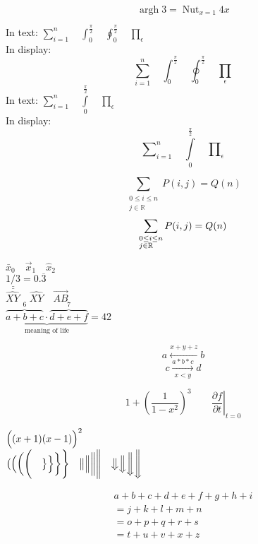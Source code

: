 \documentclass{article}
\DeclareMathOperator{\argh}{argh}
\DeclareMathOperator*{\nut}{Nut}
\begin{document}
	\[\argh 3 = \nut_{x=1} 4x\]%
	
	In text:
	$\sum_{i=1}^n \quad
	\int_0^{\frac{\pi}{2}} \quad
	\oint_0^{\frac{\pi}{2}} \quad
	\prod_\epsilon $ \\
	In display:
	\[\sum_{i=1}^n \quad
	\int_0^{\frac{\pi}{2}} \quad
	\oint_0^{\frac{\pi}{2}} \quad
	\prod_\epsilon \]
	In text:
	$\sum\limits_{i=1}^n \quad
	\int\limits_0^{\frac{\pi}{2}} \quad
	\prod\limits_\epsilon $ \\
	In display:
	\[\sum\nolimits_{i=1}^n \quad
	\int\limits_0^{\frac{\pi}{2}} \quad
	\prod\nolimits_\epsilon \]
	
	\[
	\sum_{\substack{0\le i\le n \\
	j\in \mathbb{R}}}
	P(i,j) = Q(n)
	\]
	\[
	\sum_{\begin{subarray}{l}
	0\le i\le n \\
	j\in \mathbb{R}
	\end{subarray}}
	P(i,j) = Q(n)
	\]
	
	
	$\bar{x}_0 \quad \vec{x}_1 \quad \hat{x}_2$\\
	$\underline{\underline{1/3}} = 0.\overline{3}$\\
	$\hat{XY} \quad \widehat{XY} \quad \overrightarrow{AB}$\\
	$\underbrace{\overbrace{a+b+c}^6 \cdot \overbrace{d+e+f}^7}_\text{meaning of life} =42$
	
	\[ a\xleftarrow{x+y+z} b \]
	\[ c\xrightarrow[x<y]{a*b*c}d \]
	
	
	\[1 + \left(\frac{1}{1-x^{2}}
	\right)^3 \qquad
	\left.\frac{\partial f}{\partial t}
	\right|_{t=0}\]
	
	$\Bigl((x+1)(x-1)\Bigr)^{2}$\\
	$\bigl( \Bigl( \biggl( \Biggl( \quad
	\bigr\} \Bigr\} \biggr\} \Biggr\} \quad
	\big\| \Big\| \bigg\| \Bigg\| \quad
	\big\Downarrow \Big\Downarrow
	\bigg\Downarrow \Bigg\Downarrow$
	
	
	\begin{multline}
	a + b + c + d + e + f
	+ g + h + i \\
	= j + k + l + m + n\\
	= o + p + q + r + s\\
	= t + u + v + x + z
	\end{multline}
	
\end{document}
